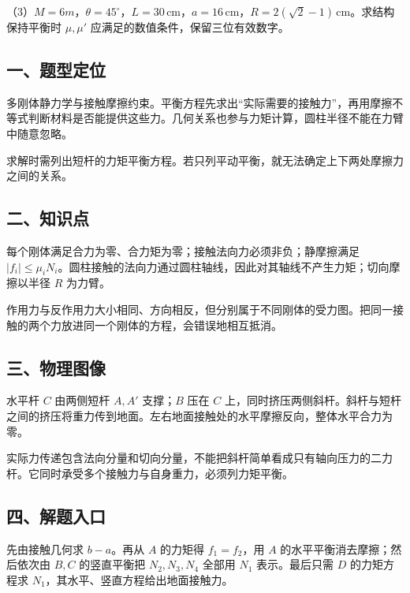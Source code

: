 \documentclass[12pt,a4paper,fontset=fandol]{ctexart}
\begin{document}
（3）\(M=6m\)，\(\theta=45^\circ\)，\(L=30\,\mathrm{cm}\)，\(a=16\,\mathrm{cm}\)，\(R=2(\sqrt2-1)\,\mathrm{cm}\)。求结构保持平衡时
\(\mu,\mu'\) 应满足的数值条件，保留三位有效数字。

\subsection{一、题型定位}\label{ux4e00ux9898ux578bux5b9aux4f4d-3}

多刚体静力学与接触摩擦约束。平衡方程先求出``实际需要的接触力''，再用摩擦不等式判断材料是否能提供这些力。几何关系也参与力矩计算，圆柱半径不能在力臂中随意忽略。

求解时需列出短杆的力矩平衡方程。若只列平动平衡，就无法确定上下两处摩擦力之间的关系。

\subsection{二、知识点}\label{ux4e8cux77e5ux8bc6ux70b9-3}

每个刚体满足合力为零、合力矩为零；接触法向力必须非负；静摩擦满足
\(|f_i|\le\mu_iN_i\)。圆柱接触的法向力通过圆柱轴线，因此对其轴线不产生力矩；切向摩擦以半径
\(R\) 为力臂。

作用力与反作用力大小相同、方向相反，但分别属于不同刚体的受力图。把同一接触的两个力放进同一个刚体的方程，会错误地相互抵消。

\subsection{三、物理图像}\label{ux4e09ux7269ux7406ux56feux50cf-3}

水平杆 \(C\) 由两侧短杆 \(A,A'\) 支撑；\(B\) 压在 \(C\)
上，同时挤压两侧斜杆。斜杆与短杆之间的挤压将重力传到地面。左右地面接触处的水平摩擦反向，整体水平合力为零。

实际力传递包含法向分量和切向分量，不能把斜杆简单看成只有轴向压力的二力杆。它同时承受多个接触力与自身重力，必须列力矩平衡。

\subsection{四、解题入口}\label{ux56dbux89e3ux9898ux5165ux53e3-3}

先由接触几何求 \(b-a\)。再从 \(A\) 的力矩得 \(f_1=f_2\)，用 \(A\)
的水平平衡消去摩擦；然后依次由 \(B,C\) 的竖直平衡把 \(N_2,N_3,N_4\)
全部用 \(N_1\) 表示。最后只需 \(D\) 的力矩方程求
\(N_1\)，其水平、竖直方程给出地面接触力。
\end{document}
